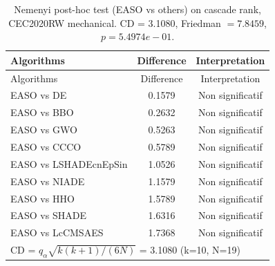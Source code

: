 \begin{center}
\small
\renewcommand{\arraystretch}{1.25}
\begin{longtable}{lcc}
\caption{Nemenyi post-hoc test (EASO vs others) on cascade rank, CEC2020RW  mechanical. CD = 3.1080, Friedman $=7.8459$, $p=5.4974e-01$.}
\label{tab:nemenyi_cascade_CEC2020RW_mechanical} \\
\toprule
Algorithms & Difference & Interpretation \\
\midrule
\endfirsthead
\toprule
Algorithms & Difference & Interpretation \\
\midrule
\endhead
EASO vs DE & 0.1579 & Non significatif \\
EASO vs BBO & 0.2632 & Non significatif \\
EASO vs GWO & 0.5263 & Non significatif \\
EASO vs CCCO & 0.5789 & Non significatif \\
EASO vs LSHADEcnEpSin & 1.0526 & Non significatif \\
EASO vs NIADE & 1.1579 & Non significatif \\
EASO vs HHO & 1.5789 & Non significatif \\
EASO vs SHADE & 1.6316 & Non significatif \\
EASO vs LcCMSAES & 1.7368 & Non significatif \\
\midrule
\multicolumn{3}{l}{CD = $q_\alpha \sqrt{k(k+1)/(6N)}$ = 3.1080 (k=10, N=19)} \\
\bottomrule
\end{longtable}
\end{center}